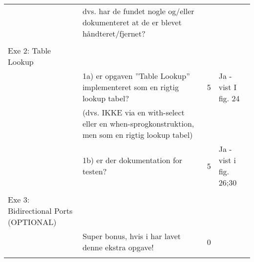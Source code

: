 \begin{table}[h]
\begin{tabularx}{\textwidth}{p{3.5cm}Xp{5mm}X}
                                                               & dvs. har de fundet nogle og/eller dokumenteret at de er blevet håndteret/fjernet?              &   &                                                                   \\
                                                               &                                                                                                &   &                                                                   \\\midrule
        Exe 2: Table Lookup                                    &                                                                                                &   &                                                                   \\
                                                               & 1a) er opgaven ”Table Lookup” implementeret som en rigtig lookup tabel?                        & 5 & Ja - vist I fig. 24                                               \\
                                                               & (dvs. IKKE via en with-select eller en when-sprogkonstruktion, men som en rigtig lookup tabel) &   &                                                                   \\
                                                               & 1b) er der dokumentation for testen?                                                           & 5 & Ja - vist i fig. 26;30                                            \\
                                                               &                                                                                                &   &                                                                   \\\midrule
        Exe 3: Bidirectional Ports (OPTIONAL)                  &                                                                                                &   &                                                                   \\
                                                               & Super bonus, hvis i har lavet denne ekstra opgave!                                             & 0 &                                                                   \\
                                                               &
    \end{tabularx}
\end{table}
